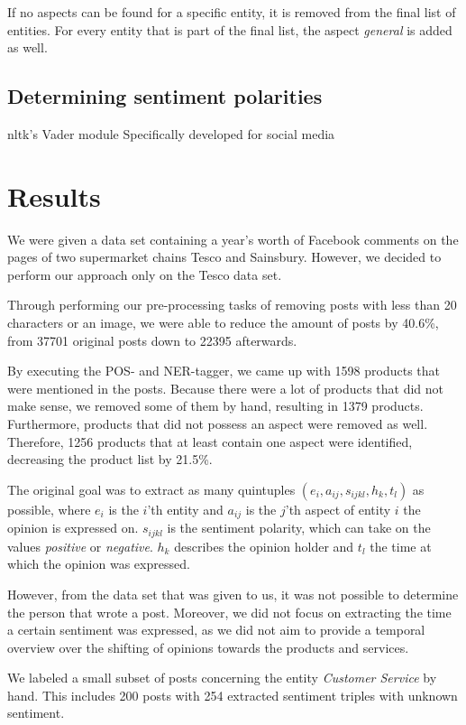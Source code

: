 \documentclass[10pt,a4paper]{article}
\begin{document}
		If no aspects can be found for a specific entity, it is removed from the final list of entities.
		For every entity that is part of the final list, the aspect \textit{general} is added as well.

		\subsection{Determining sentiment polarities}
		nltk's Vader module
		Specifically developed for social media

	\section{Results}
	\label{sec:results}
	
	We were given a data set containing a year's worth of Facebook comments on the pages of two supermarket chains Tesco and Sainsbury. However, we decided to perform our approach only on the Tesco data set.
	
	Through performing our pre-processing tasks of removing posts with less than 20 characters or an image, we were able to reduce the amount of posts by 40.6\%, from 37701 original posts down to 22395 afterwards.

	By executing the POS- and NER-tagger, we came up with 1598 products that were mentioned in the posts. Because there were a lot of products that did not make sense, we removed some of them by hand, resulting in 1379 products. Furthermore, products that did not possess an aspect were removed as well. Therefore, 1256 products that at least contain one aspect were identified, decreasing the product list by 21.5\%. 

	The original goal was to extract as many quintuples $(e_i, a_{ij}, s_{ijkl}, h_k, t_l)$ as possible, where $e_i$ is the $i$'th entity and $a_{ij}$ is the $j$'th aspect of entity $i$ the opinion is expressed on. $s_{ijkl}$ is the sentiment polarity, which can take on the values \textit{positive} or \textit{negative}. $h_k$ describes the opinion holder and $t_l$ the time at which the opinion was expressed.

	However, from the data set that was given to us, it was not possible to determine the person that wrote a post. Moreover, we did not focus on extracting the time a certain sentiment was expressed, as we did not aim to provide a temporal overview over the shifting of opinions towards the products and services.
	
	

	We labeled a small subset of posts concerning the entity \textit{Customer Service} by hand. This includes 200 posts with 254 extracted sentiment triples with unknown sentiment.
\end{document}
